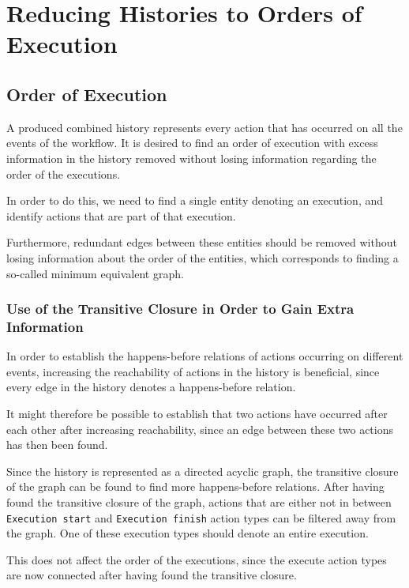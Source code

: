 \chapter{Reducing Histories to Orders of Execution}
\label{chap:order-of-execution}
\section{Order of Execution}
	A produced combined history represents every action that has occurred on all the events of the workflow.
	It is desired to find an order of execution with excess information in the history removed without losing information regarding the order of the executions. 
	
	\newpar In order to do this, we need to find a single entity denoting an execution, and identify actions that are part of that execution. 
	
	Furthermore, redundant edges between these entities should be removed without losing information about the order of the entities, which corresponds to finding a so-called minimum equivalent graph.
	
	\subsection{Use of the Transitive Closure in Order to Gain Extra Information}
	In order to establish the happens-before relations of actions occurring on different events, increasing the reachability of actions in the history is beneficial, since every edge in the history denotes a happens-before relation.  
	
	It might therefore be possible to establish that two actions have occurred after each other after increasing reachability, since an edge between these two actions has then been found.
	
	\newpar Since the history is represented as a directed acyclic graph, the transitive closure of the graph can be found to find more happens-before relations. 
	After having found the transitive closure of the graph, actions that are either not in between \texttt{Execution start} and \texttt{Execution finish} action types can be filtered away from the graph. One of these execution types should denote an entire execution.
	
	This does not affect the order of the executions, since the execute action types are now connected after having found the transitive closure.
	
